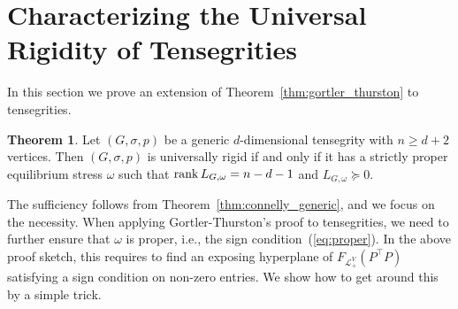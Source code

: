 \documentclass[11pt]{article}
\theoremstyle{definition}
\newtheorem{theorem}{Theorem}
\begin{document}
\section{Characterizing the Universal Rigidity of Tensegrities}\label{sec:tensegrity}
In this section we prove an extension of Theorem~\ref{thm:gortler_thurston} to tensegrities.
 \begin{theorem} \label{maintheoremtens}
        Let $(G,\sigma,p)$ be a generic $d$-dimensional tensegrity with $n \geq d+2$ vertices.
        Then  $(G,\sigma,p)$ is universally rigid if and only if  it has a strictly proper equilibrium stress $\omega$ such that 
        $\rank L_{G,\omega}=n-d-1$ and $L_{G,\omega}\succeq 0$.
 \end{theorem}  
 The sufficiency follows from Theorem~\ref{thm:connelly_generic}, and we focus on the necessity.
 When applying Gortler-Thurston's  proof  to tensegrities, we need to further ensure that $\omega$ is proper, i.e., the sign condition~(\ref{eq:proper}). 
 In the above proof sketch, this requires to find an exposing hyperplane of $F_{\mathcal{L}_+^V}(P^{\top}P)$ satisfying a sign condition on non-zero entries. We show how to get around this  by a simple trick.
\end{document}
